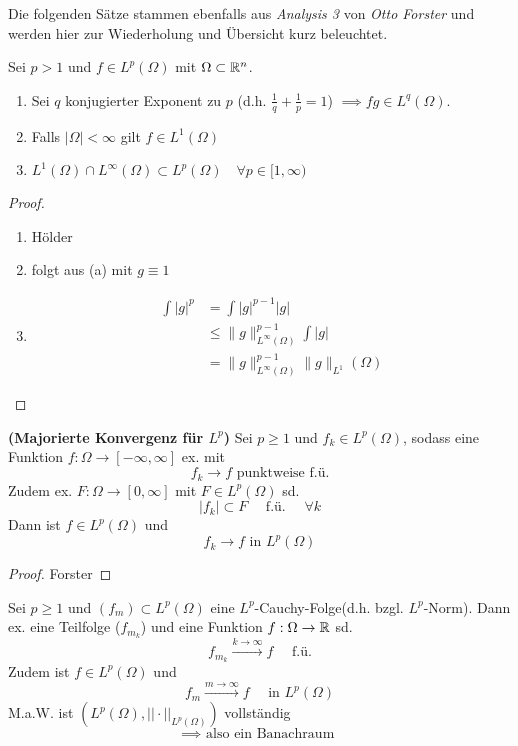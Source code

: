 Die folgenden S\"atze stammen ebenfalls aus \textit{Analysis 3} von \textit{Otto Forster} und werden hier zur Wiederholung und Übersicht kurz beleuchtet.
\enter

\begin{satz}
	Sei $p > 1$ und $f \in L^p(\Omega)$ mit $\Omega \subset \mathbb{R}^n$. 
	\renewcommand{\labelenumi}{(\alph{enumi})}
	\begin{enumerate}
		\item Sei $q$ konjugierter Exponent zu $p$ (d.h. $\frac{1}{q} + \frac{1}{p}=1$)
			$\implies fg \in L^q(\Omega)$.
		\item Falls $|\Omega| < \infty$ gilt $f \in L^1(\Omega)$
		\item $ L^1(\Omega) \cap L^{\infty}(\Omega) \subset L^p(\Omega) \quad \forall p\in [1,\infty) $
	\end{enumerate}
\end{satz}

\begin{proof}
	\enter
	\renewcommand{\labelenumi}{(\alph{enumi})}
	\begin{enumerate}
		\item H\"older
		\item folgt aus (a) mit $g\equiv1$
		\item
			\begin{align*}
				\int |g|^p &= \int |g|^{p-1}|g| \\
									 &\leq \|g\|^{p-1}_{L^\infty(\Omega)}\int |g| \\
									 &= \|g\|^{p-1}_{L^\infty(\Omega)}\|g\|_{L^1}(\Omega)
			\end{align*}
	\end{enumerate}

\end{proof}

\begin{satz}\textbf{(Majorierte Konvergenz für $L^p$)} \enter
	Sei $p \geq 1$ und $f_k \in L^p(\Omega)$, sodass eine Funktion $f:\Omega\to [-\infty,\infty]$ ex. mit
	\[f_k \to f\text{ punktweise f.\"u.}\]
	Zudem ex. $F: \Omega \to [0,\infty]$ mit $F \in L^p(\Omega)$ sd. 
	\[|f_k| \subset F \quad \text{ f.\"u. } \quad \forall k\]
	Dann ist $f\in L^p(\Omega)$ und 
	\[f_k \to f \text{ in }L^p(\Omega)\]
\end{satz}

\begin{proof}
	Forster
\end{proof}

\begin{satz} \enter
	Sei $p \geq 1$ und $(f_m) \subset L^p(\Omega)$ eine $L^p$-Cauchy-Folge(d.h.
	bzgl. $L^p$-Norm).\enter
	Dann ex. eine Teilfolge ($f_{m_k}$) und eine Funktion
	$f:\Omega\to \mathbb{R}$ sd. 
	\[f_{m_k} \overset{k\to \infty}{\longrightarrow} f \quad \text{ f.ü.}\]
	Zudem ist $f\in L^p(\Omega)$ und
	\[f_m \stackrel{m\rightarrow \infty}{\longrightarrow} f \quad \text{ in }
	L^p(\Omega)\]
	M.a.W. ist $\left(L^p(\Omega), ||\cdot||_{L^p(\Omega)}\right)$ vollst\"andig 
	\[\implies \text{ also ein Banachraum } \]
\end{satz}

